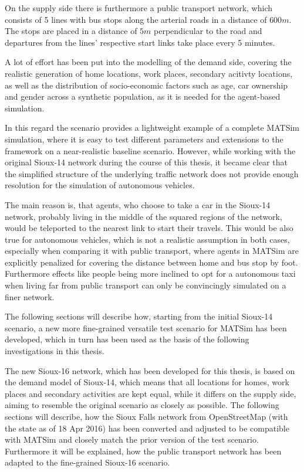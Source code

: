 On the supply side there is furthermore a public transport network, which
consists of 5 lines with bus stops along the arterial roads in a distance of $600m$.
The stops are placed in a distance of $5m$ perpendicular to the road and departures
from the lines' respective start links take place every 5 minutes.

A lot of effort has been put into the modelling of the demand side, covering the
realistic generation of home locations, work places, secondary acitivty locations,
as well as the distribution of socio-economic factors such as age, car ownership
and gender across a synthetic population, as it is needed for the agent-based
simulation.

In this regard the scenario provides a lightweight example of a complete MATSim
simulation, where it is easy to test different parameters and extensions to the
framework on a near-realistic baseline scenario. However, while working with the
original Sioux-14 network during the course of this thesis, it became clear that
the simplified structure of the underlying traffic network does not provide enough
resolution for the simulation of autonomous vehicles.

The main reason is, that agents, who choose to take a car in the Sioux-14 network,
probably living in the middle of the squared regions of the network, would be
teleported to the nearest link to start their travels. This would be also true
for autonomous vehicles, which is not a realistic assumption in both cases, especially
when comparing it with public transport, where agents in MATSim are explicitly
penalized for covering the distance between home and bus stop by foot.
Furthermore effects like people being more inclined to opt for a autonomous taxi
when living far from public transport can only be convincingly simulated on a
finer network.

The following sections will describe how, starting from the initial Sioux-14
scenario, a new more fine-grained versatile test scenario for MATSim has been
developed, which in turn has been used as the basis of the following investigations in this
thesis.

The new Sioux-16 network, which has been developed for this thesis, is based on the
demand model of Sioux-14, which means that all locations for homes, work places and
secondary activities are kept equal, while it differs on the supply side, aiming
to resemble the original scenario as closely as possible. The following sections
will describe, how the Sioux Falls network from OpenStreetMap (with the state
as of 18 Apr 2016) has been converted and adjusted to be compatible with MATSim
and closely match the prior version of the test scenario. Furthermore it will
be explained, how the public transport network has been adapted to the fine-grained
Sioux-16 scenario.

